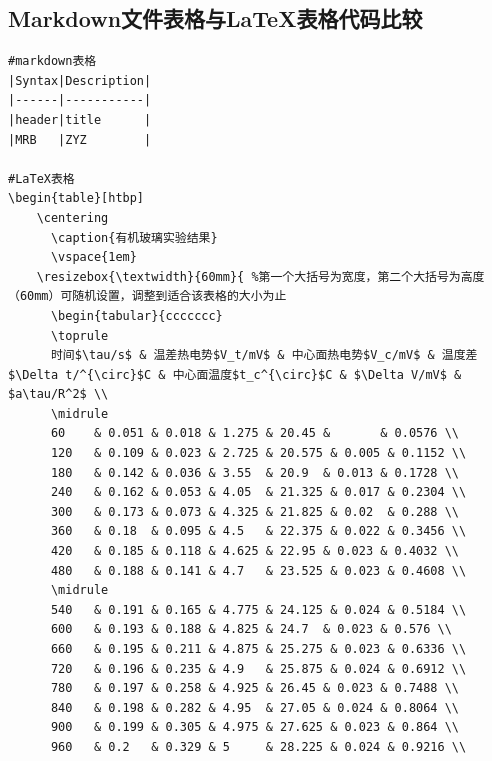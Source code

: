 \documentclass[10pt,a4paper,twoside,UTF8]{ctexart}
\begin{document}
\subsection{Markdown文件表格与LaTeX表格代码比较}
\begin{lstlisting}
#markdown表格
|Syntax|Description|
|------|-----------|
|header|title      |
|MRB   |ZYZ        |

#LaTeX表格
\begin{table}[htbp]
	\centering
	  \caption{有机玻璃实验结果}
	  \vspace{1em}
	\resizebox{\textwidth}{60mm}{ %第一个大括号为宽度，第二个大括号为高度（60mm）可随机设置，调整到适合该表格的大小为止
	  \begin{tabular}{ccccccc}
	  \toprule
	  时间$\tau/s$ & 温差热电势$V_t/mV$ & 中心面热电势$V_c/mV$ & 温度差$\Delta t/^{\circ}$C & 中心面温度$t_c^{\circ}$C & $\Delta V/mV$ & $a\tau/R^2$ \\
	  \midrule
	  60    & 0.051 & 0.018 & 1.275 & 20.45 &       & 0.0576 \\
	  120   & 0.109 & 0.023 & 2.725 & 20.575 & 0.005 & 0.1152 \\
	  180   & 0.142 & 0.036 & 3.55  & 20.9  & 0.013 & 0.1728 \\
	  240   & 0.162 & 0.053 & 4.05  & 21.325 & 0.017 & 0.2304 \\
	  300   & 0.173 & 0.073 & 4.325 & 21.825 & 0.02  & 0.288 \\
	  360   & 0.18  & 0.095 & 4.5   & 22.375 & 0.022 & 0.3456 \\
	  420   & 0.185 & 0.118 & 4.625 & 22.95 & 0.023 & 0.4032 \\
	  480   & 0.188 & 0.141 & 4.7   & 23.525 & 0.023 & 0.4608 \\
	  \midrule
	  540   & 0.191 & 0.165 & 4.775 & 24.125 & 0.024 & 0.5184 \\
	  600   & 0.193 & 0.188 & 4.825 & 24.7  & 0.023 & 0.576 \\
	  660   & 0.195 & 0.211 & 4.875 & 25.275 & 0.023 & 0.6336 \\
	  720   & 0.196 & 0.235 & 4.9   & 25.875 & 0.024 & 0.6912 \\
	  780   & 0.197 & 0.258 & 4.925 & 26.45 & 0.023 & 0.7488 \\
	  840   & 0.198 & 0.282 & 4.95  & 27.05 & 0.024 & 0.8064 \\
	  900   & 0.199 & 0.305 & 4.975 & 27.625 & 0.023 & 0.864 \\
	  960   & 0.2   & 0.329 & 5     & 28.225 & 0.024 & 0.9216 \\

\end{lstlisting}
\end{document}
